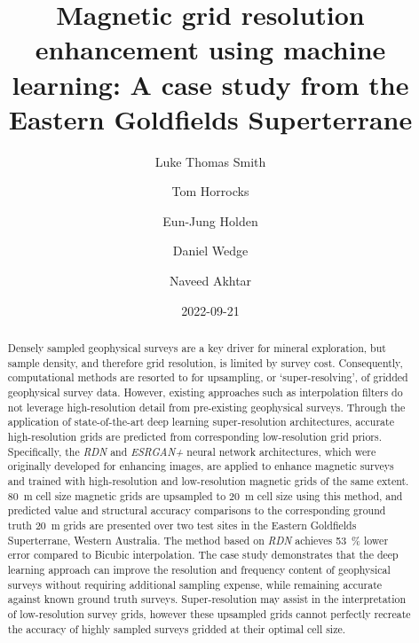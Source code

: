 \documentclass[manuscript.tex]{subfiles}
\begin{document}
\title{Magnetic grid resolution enhancement using machine learning: A case study from the Eastern Goldfields Superterrane}
\author[1*]{Luke Thomas Smith}
\author[1]{Tom Horrocks}
\author[1]{Eun-Jung Holden}
\author[1]{Daniel Wedge}
\author[2]{Naveed Akhtar}
\date{2022-09-21}
\maketitle{}

\begin{abstract}
    Densely sampled geophysical surveys are a key driver for mineral exploration, but sample density, and therefore grid resolution, is limited by survey cost.
    Consequently, computational methods are resorted to for upsampling, or `super-resolving', of gridded geophysical survey data.
    However, existing approaches such as interpolation filters do not leverage high-resolution detail from pre-existing geophysical surveys.
    Through the application of state-of-the-art deep learning super-resolution architectures, accurate high-resolution grids are predicted from corresponding low-resolution grid priors.
    Specifically, the \emph{RDN} and \emph{ESRGAN+} neural network architectures, which were originally developed for enhancing images, are applied to enhance magnetic surveys and trained with high-resolution and low-resolution magnetic grids of the same extent.
    \qty{80}{\metre} cell size magnetic grids are upsampled to \qty{20}{\metre} cell size using this method, and predicted value and structural accuracy comparisons to the corresponding ground truth \qty{20}{\metre} grids are presented over two test sites in the Eastern Goldfields Superterrane, Western Australia.
    The method based on \emph{RDN} achieves \qty{53}{\percent} lower error compared to Bicubic interpolation.
    The case study demonstrates that the deep learning approach can improve the resolution and frequency content of geophysical surveys without requiring additional sampling expense, while remaining accurate against known ground truth surveys.
    Super-resolution may assist in the interpretation of low-resolution survey grids, however these upsampled grids cannot perfectly recreate the accuracy of highly sampled surveys gridded at their optimal cell size.
\end{abstract}
\end{document}

